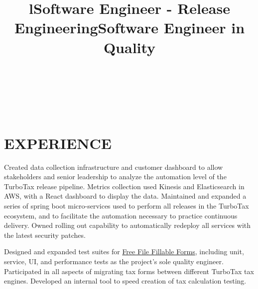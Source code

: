 \documentclass[margin]{resume/res}
\begin{document}
\begin{resume}



\begin{format}
\title{l}\\
\\
\body\\
\end{format}

\section{EXPERIENCE}

\title{\textbf{Software Engineer - Release Engineering}}
\begin{position}
Created data collection infrastructure and customer dashboard to allow stakeholders and senior leadership to analyze the automation level of the TurboTax release pipeline. Metrics collection used Kinesis and Elasticsearch in AWS, with a React dashboard to display the data. Maintained and expanded a series of spring boot micro-services used to perform all releases in the TurboTax ecosystem, and to facilitate the automation necessary to practice continuous delivery. Owned rolling out capability to automatically redeploy all services with the latest security patches.
\end{position}

\title{\textbf{Software Engineer in Quality}}
\begin{position}
Designed and expanded test suites for \href{https://www.FreeFileFillableForms.com}{Free File Fillable Forms}, including unit, service, UI, and performance tests as the project's sole quality engineer. Participated in all aspects of migrating tax forms between different TurboTax tax engines. Developed an internal tool to speed creation of tax calculation testing.
\end{position}


\end{resume}
\end{document}
